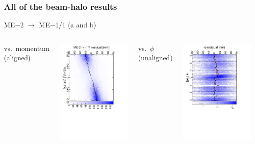 \documentclass[compress]{beamer}
\begin{document}
\begin{frame}
\frametitle{All of the beam-halo results}

\begin{center}
ME$-$2 $\to$ ME$-$1/1 (a and b)
\end{center}

\begin{columns}
\centering vs.\ momentum (aligned)

\includegraphics[height=\linewidth, angle=90]{linear_mem2to1inner.pdf}

\centering vs.\ $\phi$ (unaligned)

\includegraphics[height=\linewidth, angle=90]{diskiter01_m2to1inner.pdf}


\end{columns}
\end{frame}
\end{document}
